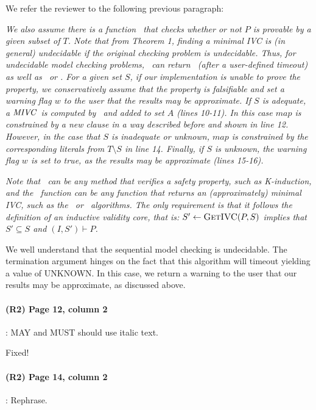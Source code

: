 \documentclass{article}
\begin{document}
\noindent We refer the reviewer to the following previous paragraph: 

\textit{We also assume there is a function \isadeq\ that checks whether or
not $P$ is provable by a given subset of $T$.  Note that from Theorem 1, finding a minimal IVC is (in general) undecidable if the original checking problem is undecidable.  Thus, for undecidable model checking problems, \isadeq\  can return \unknown ~(after a user-defined timeout) as well as \adequate\ or \inadequate.  For a given set $S$, if our implementation is unable to prove the property, we conservatively assume that the property is falsifiable and set a warning flag $w$ to the user that the results may be approximate.  If $S$ is adequate, a $\textit{MIVC}$~is computed by \getivc ~and added to set $A$ (lines 10-11). In this case $map$ is constrained by a new
clause in a way described before and shown in line 12. 
However, in the
case that $S$ is inadequate or unknown, $map$ is constrained by the corresponding
literals from $T \setminus S$ in line 14.  Finally, if $S$ is unknown, the warning flag $w$ is set to true, as the results may be approximate (lines 15-16).}

\textit{Note that \isadeq ~can be any method that verifies a safety property, such as K-induction, and the \getivc\ function can be any function that returns an (approximately) minimal IVC, such as the \ucalg\ or \ucbfalg\ algorithms. The only requirement is that it follows the definition of an inductive validity core, that is: $S' \leftarrow \textsc{GetIVC} (P, S)$ implies that $S' \subseteq S$ and $(I, S') \vdash P$.}

We well understand that the sequential model checking is undecidable.  The termination argument hinges on the fact that this algorithm will timeout yielding a value of UNKNOWN.  In this case, we return a warning to the user that our results may be approximate, as discussed above.

\paragraph{(R2) Page 12, column 2} : MAY and MUST should use italic text.
\vspace{0.05in}

Fixed!

\paragraph{(R2) Page 14, column 2} : Rephrase.
\vspace{0.05in}
\end{document}
